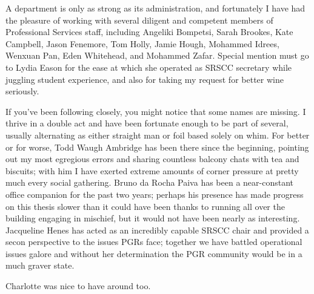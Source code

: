 A department is only as strong as its administration, and fortunately I have had
the pleasure of working with several diligent and competent members of
Professional Services staff, including Angeliki Bompetsi, Sarah Brookes,
Kate Campbell, Jason Fenemore, Tom Holly, Jamie Hough, Mohammed Idrees,
Wenxuan Pan, Eden Whitehead, and Mohammed Zafar.
Special mention must go to Lydia Eason for the ease at which she operated as
SRSCC secretary while juggling student experience, and also for taking my
request for better wine seriously.

If you've been following closely, you might notice that some names are missing.
I thrive in a double act and have been fortunate enough to be part of several,
usually alternating as either straight man or foil based solely on whim.
For better or for worse, Todd Waugh Ambridge has been there since the beginning,
pointing out my most egregious errors and sharing countless balcony chats with
tea and biscuits; with him I have exerted extreme amounts of corner pressure at
pretty much every social gathering.
Bruno da Rocha Paiva has been a near-constant office companion for the past two
years; perhaps his presence has made progress on this thesis slower than it
could have been thanks to running all over the building engaging in mischief,
but it would not have been nearly as interesting.
Jacqueline Henes has acted as an incredibly capable SRSCC chair and provided a
secon perspective to the issues PGRs face; together we have battled operational
issues galore and without her determination the PGR community would be in a much
graver state.

Charlotte was nice to have around too.

